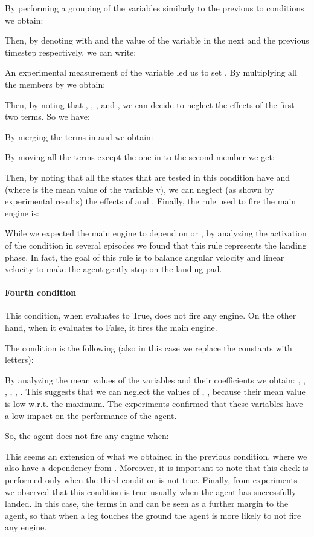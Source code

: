 \documentclass[review,english]{elsarticle}
\begin{document}
By performing a grouping of the variables similarly to the previous to conditions we obtain:

Then, by denoting with  and  the value of the variable  in the next and the previous timestep respectively, we can write:

An experimental measurement of the  variable led us to set .
By multiplying all the members by  we obtain:

Then, by noting that , , ,  and , we can decide to neglect the effects of the first two terms.
So we have:

By merging the terms in  and  we obtain: 

By moving all the terms except the one in  to the second member we get:

Then, by noting that all the states that are tested in this condition have  and  (where  is the mean value of the variable v), we can neglect (as shown by experimental results) the effects of  and .
Finally, the rule used to fire the main engine is:


While we expected the main engine to depend on  or , by analyzing the activation of the condition in several episodes we found that this rule represents the landing phase. 
In fact, the goal of this rule is to balance angular velocity and linear velocity to make the agent gently stop on the landing pad.

\paragraph{Fourth condition}
This condition, when evaluates to True, does not fire any engine.
On the other hand, when it evaluates to False, it fires the main engine.

The condition is the following (also in this case we replace the constants with letters):


By analyzing the mean values of the variables and their coefficients we obtain: , , , , , .
This suggests that we can neglect the values of , ,  because their mean value is low w.r.t. the maximum. 
The experiments confirmed that these variables have a low impact on the performance of the agent.

So, the agent does not fire any engine when:


This seems an extension of what we obtained in the previous condition, where we also have a dependency from .
Moreover, it is important to note that this check is performed only when the third condition is not true.
Finally, from experiments we observed that this condition is true usually when the agent has successfully landed. 
In this case, the terms in  and  can be seen as a further margin to the agent, so that when a leg touches the ground the agent is more likely to not fire any engine.
\end{document}
